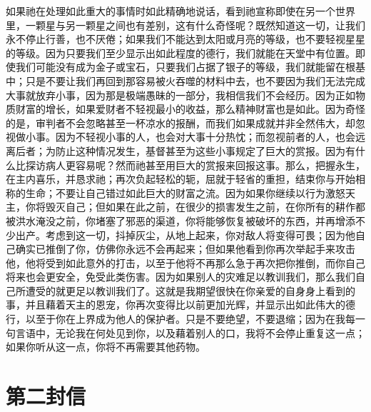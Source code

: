 如果祂在处理如此重大的事情时如此精确地说话，看到祂宣称即使在另一个世界里，一颗星与另一颗星之间也有差别，这有什么奇怪呢？既然知道这一切，让我们永不停止行善，也不厌倦；如果我们不能达到太阳或月亮的等级，也不要轻视星星的等级。因为只要我们至少显示出如此程度的德行，我们就能在天堂中有位置。即使我们可能没有成为金子或宝石，只要我们占据了银子的等级，我们就能留在根基中；只是不要让我们再回到那容易被火吞噬的材料中去，也不要因为我们无法完成大事就放弃小事，因为那是极端愚昧的一部分，我相信我们不会经历。因为正如物质财富的增长，如果爱财者不轻视最小的收益，那么精神财富也是如此。因为奇怪的是，审判者不会忽略甚至一杯凉水的报酬，而我们如果成就并非全然伟大，却忽视做小事。因为不轻视小事的人，也会对大事十分热忱；而忽视前者的人，也会远离后者；为防止这种情况发生，基督甚至为这些小事规定了巨大的赏报。因为有什么比探访病人更容易呢？然而祂甚至用巨大的赏报来回报这事。那么，把握永生，在主内喜乐，并恳求祂；再次负起轻松的轭，屈就于轻省的重担，结束你与开始相称的生命；不要让自己错过如此巨大的财富之流。因为如果你继续以行为激怒天主，你将毁灭自己；但如果在此之前，在很少的损害发生之前，在你所有的耕作都被洪水淹没之前，你堵塞了邪恶的渠道，你将能够恢复被破坏的东西，并再增添不少出产。考虑到这一切，抖掉灰尘，从地上起来，你对敌人将变得可畏；因为他自己确实已推倒了你，仿佛你永远不会再起来；但如果他看到你再次举起手来攻击他，他将受到如此意外的打击，以至于他将不再那么急于再次把你推倒，而你自己将来也会更安全，免受此类伤害。因为如果别人的灾难足以教训我们，那么我们自己所遭受的就更足以教训我们了。这就是我期望很快在你亲爱的自身身上看到的事，并且藉着天主的恩宠，你再次变得比以前更加光辉，并显示出如此伟大的德行，以至于你在上界成为他人的保护者。只是不要绝望，不要退缩；因为在我每一句言语中，无论我在何处见到你，以及藉着别人的口，我将不会停止重复这一点；如果你听从这一点，你将不再需要其他药物。\par


\section{第二封信}


